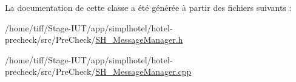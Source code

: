La documentation de cette classe a été générée à partir des fichiers suivants \-:\begin{DoxyCompactItemize}
\item 
/home/tiff/\-Stage-\/\-I\-U\-T/app/simplhotel/hotel-\/precheck/src/\-Pre\-Check/\hyperlink{SH__MessageManager_8h}{S\-H\-\_\-\-Message\-Manager.\-h}\item 
/home/tiff/\-Stage-\/\-I\-U\-T/app/simplhotel/hotel-\/precheck/src/\-Pre\-Check/\hyperlink{SH__MessageManager_8cpp}{S\-H\-\_\-\-Message\-Manager.\-cpp}\end{DoxyCompactItemize}
